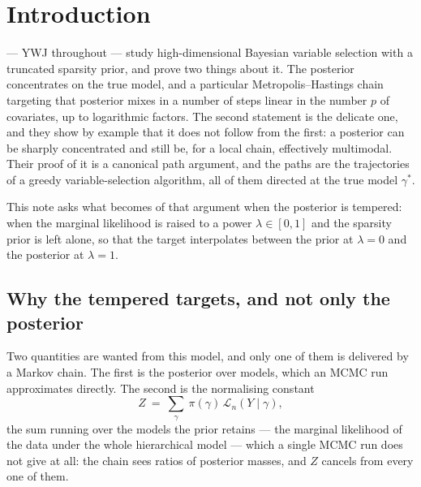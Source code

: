 \documentclass[aos]{imsart}
\theoremstyle{plain}
\theoremstyle{definition}
\begin{document}
    \maketitle


    \section{Introduction}
    \label{sec:intro}

    \citet{YangWainwrightJordan2016} --- YWJ throughout --- study
    high-dimensional Bayesian variable selection with a truncated sparsity
    prior, and prove two things about it. The posterior concentrates on the
    true model, and a particular Metropolis--Hastings chain targeting that
    posterior mixes in a number of steps linear in the number $p$ of
    covariates, up to logarithmic factors. The second statement is the
    delicate one, and they show by example that it does not follow from the
    first: a posterior can be sharply concentrated and still be, for a local
    chain, effectively multimodal. Their proof of it is a canonical path
    argument, and the paths are the trajectories of a greedy
    variable-selection algorithm, all of them directed at the true model
    $\gamma^{\ast}$.

    This note asks what becomes of that argument when the posterior is
    tempered: when the marginal likelihood is raised to a power
    $\lambda\in[0,1]$ and the sparsity prior is left alone, so that the
    target interpolates between the prior at $\lambda=0$ and the posterior
    at $\lambda=1$.

    \subsection*{Why the tempered targets, and not only the posterior}

    Two quantities are wanted from this model, and only one of them is
    delivered by a Markov chain. The first is the posterior over models,
    which an MCMC run approximates directly. The second is the normalising
    constant
    \begin{equation*}
        Z\ =\ \sum_{\gamma}\ \pi(\gamma)\,
        \mathcal{L}_n(Y\mid\gamma) ,
    \end{equation*}
    the sum running over the models the prior retains ---
    the marginal likelihood of the data under the whole hierarchical model ---
    which a single MCMC run does not give at all: the chain sees ratios of
    posterior masses, and $Z$ cancels from every one of them.
\end{document}
